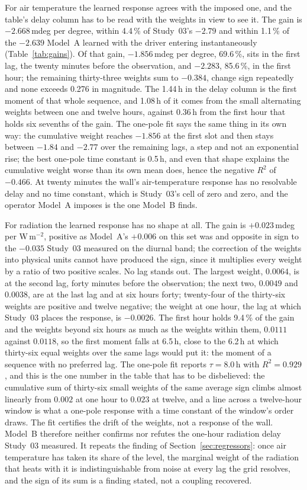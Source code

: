\documentclass[11pt,a4paper]{article}
\begin{document}
For air temperature the learned response agrees with the imposed one, and the
table's delay column has to be read with the weights in view to see it. The
gain is $-2.668$\,mdeg per degree, within 4.4\,\% of Study~03's $-2.79$ and
within 1.1\,\% of the $-2.639$ Model~A learned with the driver entering
instantaneously (Table~\ref{tab:gains}). Of that gain, $-1.856$\,mdeg per
degree, 69.6\,\%, sits in the first lag, the twenty minutes before the
observation, and $-2.283$, 85.6\,\%, in the first hour; the remaining
thirty-three weights sum to $-0.384$, change sign repeatedly and none exceeds
0.276 in magnitude. The 1.44\,h in the delay column is the first moment of
that whole sequence, and 1.08\,h of it comes from the small alternating
weights between one and twelve hours, against 0.36\,h from the first hour
that holds six sevenths of the gain. The one-pole fit says the same thing in
its own way: the cumulative weight reaches $-1.856$ at the first slot and then
stays between $-1.84$ and $-2.77$ over the remaining lags, a step and not an
exponential rise; the best one-pole time constant is 0.5\,h, and even that
shape explains the cumulative weight worse than its own mean does, hence the
negative $R^2$ of $-0.466$. At twenty minutes the wall's air-temperature response has no
resolvable delay and no time constant, which is Study~03's cell of zero and
zero, and the operator Model~A imposes is the one Model~B finds.

For radiation the learned response has no shape at all. The gain is
$+0.023$\,mdeg per W\,m$^{-2}$, positive as Model~A's $+0.006$ on this set
was and opposite in sign to the $-0.035$ Study~03 measured on the diurnal
band; the correction of the weights into physical units cannot have produced
the sign, since it multiplies every weight by a ratio of two positive scales.
No lag stands out. The largest weight, $0.0064$, is at the second lag, forty
minutes before the observation; the next two, $0.0049$ and $0.0038$, are at
the last lag and at six hours forty; twenty-four of the thirty-six weights
are positive and twelve negative; the weight at one hour, the lag at which
Study~03 places the response, is $-0.0026$. The first hour holds 9.4\,\% of
the gain and the weights beyond six hours as much as the weights within them,
$0.0111$ against $0.0118$, so the first moment falls at 6.5\,h, close to the
6.2\,h at which thirty-six equal weights over the same lags would put it: the
moment of a sequence with no preferred lag. The one-pole fit reports $\tau = 8.0$\,h with $R^2 = 0.929$, and this
is the one number in the table that has to be disbelieved: the cumulative sum
of thirty-six small weights of the same average sign climbs almost linearly
from $0.002$ at one hour to $0.023$ at twelve, and a line across a
twelve-hour window is what a one-pole response with a time constant of the
window's order draws. The fit certifies the drift of the weights, not a
response of the wall. Model~B therefore neither confirms nor refutes the
one-hour radiation delay Study~03 measured. It repeats the finding of
Section~\ref{sec:regressors}: once air temperature has taken its share of
the level, the marginal weight of the radiation that heats with it is
indistinguishable from noise at every lag the grid resolves, and the sign of
its sum is a finding stated, not a coupling recovered.
\end{document}
